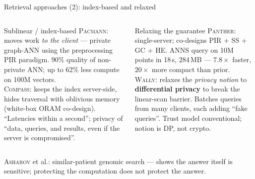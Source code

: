 \documentclass[10pt,aspectratio=169]{beamer}
\newcommand{\sys}[1]{\textsc{#1}\xspace}
\begin{document}
\begin{frame}{Retrieval approaches (2): index-based and relaxed}
  \begin{columns}[T]
    \begin{block}{Sublinear / index-based}
      \footnotesize
      \sys{Pacmann}: moves work \emph{to the client} --- private graph-ANN using the
      preprocessing PIR paradigm. 90\% quality of non-private ANN; up to 62\% less
      compute on 100M vectors.\\[0.3em]
      \sys{Compass}: keeps the index server-side, hides traversal with oblivious memory
      (white-box ORAM co-design). ``Latencies within a second''; privacy of
      ``data, queries, and results, even if the server is compromised''.
    \end{block}
    \begin{block}{Relaxing the guarantee}
      \footnotesize
      \sys{Panther}: single-server; co-designs PIR + SS + GC + HE. ANNS query on 10M
      points in 18\,s, 284\,MB --- $7.8\times$ faster, $20\times$ more compact than prior.\\[0.3em]
      \sys{Wally}: relaxes the \emph{privacy notion} to \textbf{differential privacy} to break
      the linear-scan barrier. Batches queries from many clients, each adding
      ``fake queries''. Trust model conventional; notion is DP, not crypto.
    \end{block}
  \end{columns}
  \vspace{0.2em}
  \begin{center}\scriptsize
  \sys{Asharov} et al.: similar-patient genomic search --- shows the \alert{answer itself}
  is sensitive; protecting the computation does not protect the answer.
  \end{center}
\end{frame}
 
\end{document}
